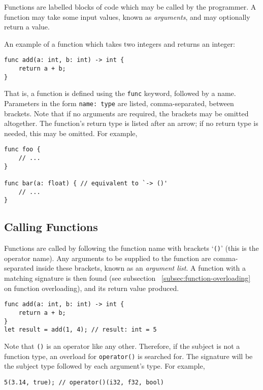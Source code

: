 \documentclass{article}
\begin{document}
    Functions are labelled blocks of code which may be called by the programmer.
    A function may take some input values, known as \textit{arguments}, and may optionally return a value.

    An example of a function which takes two integers and returns an integer:
    \begin{lstlisting}[language=CustomLang]
func add(a: int, b: int) -> int {
    return a + b;
}
    \end{lstlisting}

    That is, a function is defined using the \texttt{func} keyword, followed by a name.
    Parameters in the form \texttt{name: type} are listed, comma-separated, between brackets.
    Note that if no arguments are required, the brackets may be omitted altogether.
    The function's return type is listed after an arrow; if no return type is needed, this may be omitted.
    For example,
    \begin{lstlisting}[language=CustomLang]
func foo {
    // ...
}

func bar(a: float) { // equivalent to `-> ()'
    // ...
}
    \end{lstlisting}

    \subsection{Calling Functions}

    Functions are called by following the function name with brackets `\texttt{()}' (this is the operator name).
    Any arguments to be supplied to the function are comma-separated inside these brackets, known as an \textit{argument list}.
    A function with a matching signature is then found (see subsection ~\ref{subsec:function-overloading} on function overloading), and its return value produced.

    \begin{lstlisting}[language=CustomLang]
func add(a: int, b: int) -> int {
    return a + b;
}
let result = add(1, 4); // result: int = 5
    \end{lstlisting}

    Note that \texttt{()} is an operator like any other.
    Therefore, if the subject is not a function type, an overload for \texttt{operator()} is searched for.
    The signature will be the subject type followed by each argument's type.
    For example,

    \begin{lstlisting}[language=CustomLang]
5(3.14, true); // operator()(i32, f32, bool)
    \end{lstlisting}
\end{document}
